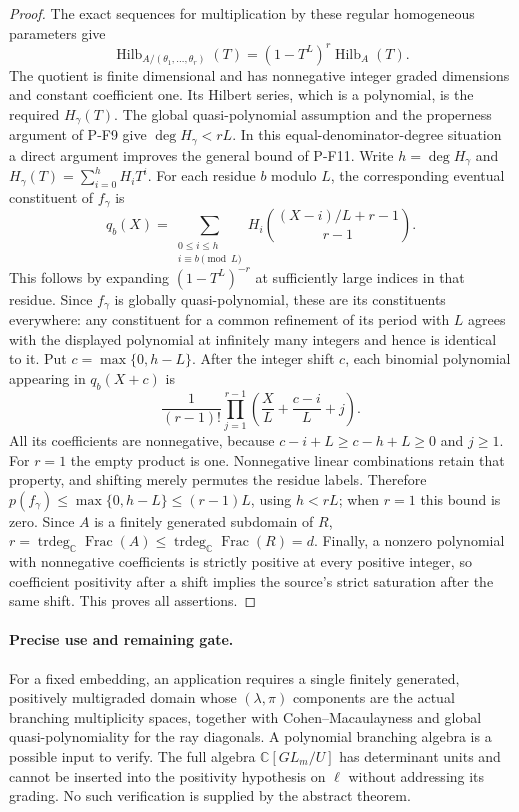 \documentclass[11pt,a4paper]{article}
\begin{document}
\begin{proof}
The exact sequences for multiplication by these regular homogeneous
parameters give
\[
 \operatorname{Hilb}_{A/(\theta_1,\ldots,\theta_r)}(T)
 =(1-T^L)^r\operatorname{Hilb}_{A}(T).
\]
The quotient is finite dimensional and has nonnegative integer graded
dimensions and constant coefficient one. Its Hilbert series, which
is a polynomial, is the required $H_\gamma(T)$. The global quasi-polynomial assumption
and the properness argument of P-F9 give
$\deg H_\gamma<rL$.
In this equal-denominator-degree situation a direct argument improves
the general bound of P-F11. Write $h=\deg H_\gamma$ and
$H_\gamma(T)=\sum_{i=0}^h H_iT^i$.
For each residue $b$ modulo $L$, the corresponding eventual constituent
of $f_\gamma$ is
\[
 q_b(X)=\sum_{\substack{0\le i\le h\\i\equiv b\pmod L}}
 H_i\binom{(X-i)/L+r-1}{r-1}.
\]
This follows by expanding $(1-T^L)^{-r}$ at sufficiently large
indices in that residue. Since $f_\gamma$ is globally
quasi-polynomial, these are its constituents everywhere: any
constituent for a common refinement of its period with $L$ agrees
with the displayed polynomial at infinitely many integers and hence
is identical to it. Put $c=\max\{0,h-L\}$. After the integer shift
$c$, each binomial polynomial appearing in $q_b(X+c)$ is
\[
 \frac{1}{(r-1)!}\prod_{j=1}^{r-1}
 \left(\frac{X}{L}+\frac{c-i}{L}+j\right).
\]
All its coefficients are nonnegative, because
$c-i+L\ge c-h+L\ge0$ and $j\ge1$.
For $r=1$ the empty product is one. Nonnegative linear combinations
retain that property, and shifting merely permutes the residue
labels. Therefore $p(f_\gamma)\le\max\{0,h-L\}\le(r-1)L$,
using $h<rL$; when $r=1$ this bound is zero.
Since $A$ is a finitely generated subdomain of $R$,
$r=\operatorname{trdeg}_\mathbb C\operatorname{Frac}(A)
\le\operatorname{trdeg}_\mathbb C\operatorname{Frac}(R)=d$.
Finally, a nonzero polynomial with nonnegative coefficients is
strictly positive at every positive integer, so coefficient positivity
after a shift implies the source's strict saturation after the same
shift. This proves all assertions.
\end{proof}

\paragraph{Precise use and remaining gate.}
For a fixed embedding, an application requires a single finitely
generated, positively multigraded domain whose $(\lambda,\pi)$
components are the actual branching multiplicity spaces, together with
Cohen--Macaulayness and global quasi-polynomiality for the ray diagonals.
A polynomial branching algebra is a possible input to verify.
The full algebra $\mathbb C[GL_m/U]$ has determinant units and cannot
be inserted into the positivity hypothesis on $\ell$ without addressing
its grading. No such verification is supplied by the abstract theorem.
\end{document}
